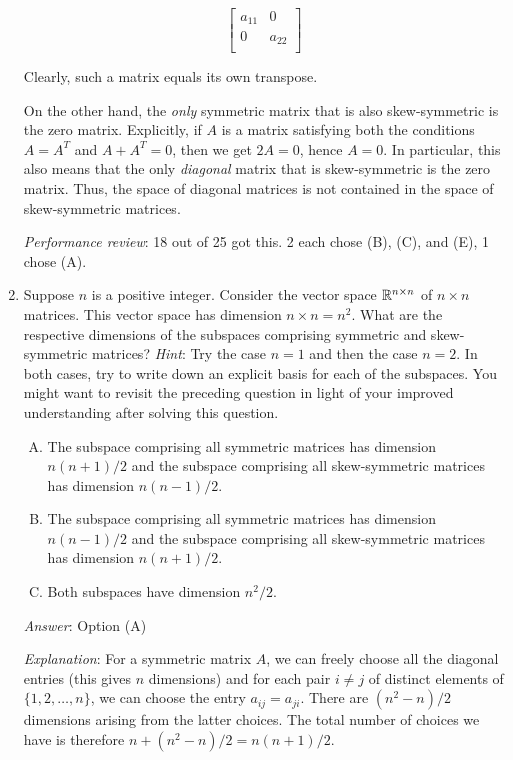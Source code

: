\documentclass[10pt]{amsart}
\begin{document}
\begin{enumerate}
  $$\left[\begin{matrix} a_{11} & 0 \\ 0 & a_{22} \\\end{matrix}\right]$$

  Clearly, such a matrix equals its own transpose.

  On the other hand, the {\em only} symmetric matrix that is also
  skew-symmetric is the zero matrix. Explicitly, if $A$ is a matrix
  satisfying both the conditions $A = A^T$ and $A + A^T = 0$, then we
  get $2A = 0$, hence $A = 0$. In particular, this also means that the
  only {\em diagonal} matrix that is skew-symmetric is the zero
  matrix. Thus, the space of diagonal matrices is not contained in the
  space of skew-symmetric matrices.

  {\em Performance review}: 18 out of 25 got this. 2 each chose (B),
  (C), and (E), 1 chose (A).

\item Suppose $n$ is a positive integer. Consider the vector space
  $\mathbb{R}^{n \times n}$ of $n \times n$ matrices. This vector space has
  dimension $n \times n = n^2$. What are the respective dimensions of
  the subspaces comprising symmetric and skew-symmetric matrices? {\em
    Hint}: Try the case $n = 1$ and then the case $n = 2$. In both
  cases, try to write down an explicit basis for each of the
  subspaces. You might want to revisit the preceding question in light
  of your improved understanding after solving this question.

  \begin{enumerate}[(A)]
  \item The subspace comprising all symmetric matrices has dimension
    $n(n + 1)/2$ and the subspace comprising all skew-symmetric
    matrices has dimension $n(n - 1)/2$.
  \item The subspace comprising all symmetric matrices has dimension
    $n(n - 1)/2$ and the subspace comprising all skew-symmetric
    matrices has dimension $n(n + 1)/2$.
  \item Both subspaces have dimension $n^2/2$.
  \end{enumerate}

  {\em Answer}: Option (A)

  {\em Explanation}: For a symmetric matrix $A$, we can freely choose
  all the diagonal entries (this gives $n$ dimensions) and for each
  pair $i \ne j$ of distinct elements of $\{ 1,2,\dots,n \}$, we can
  choose the entry $a_{ij} = a_{ji}$. There are $(n^2 - n)/2$
  dimensions arising from the latter choices. The total number of
  choices we have is therefore $n + (n^2 - n)/2 = n(n+1)/2$.


\end{enumerate}
\end{document}
